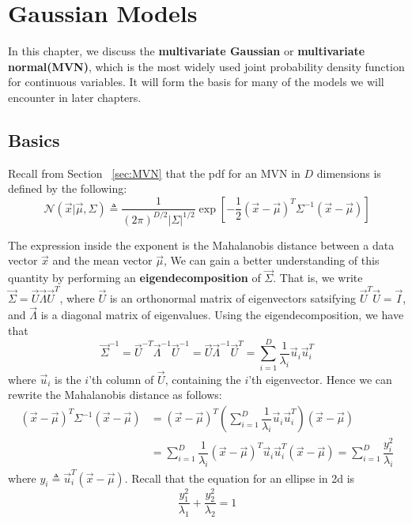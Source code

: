 \chapter{Gaussian Models}
\label{chap:MVN}

In this chapter, we discuss the \textbf{multivariate Gaussian} or \textbf{multivariate normal(MVN)}, which is the most widely used joint probability density function for continuous variables. It will form the basis for many of the models we will encounter in later chapters.


\section{Basics}
Recall from Section ~\ref{sec:MVN} that the pdf for an MVN in $D$ dimensions is defined by the following:
\begin{equation}
\mathcal{N}(\vec{x}|\vec{\mu},\Sigma) \triangleq \dfrac{1}{(2\pi)^{D/2}|\Sigma|^{1/2}}\exp\left[-\dfrac{1}{2}(\vec{x}-\vec{\mu})^T\Sigma^{-1}(\vec{x}-\vec{\mu})\right]
\end{equation}

The expression inside the exponent is the Mahalanobis distance between a data vector $\vec{x}$ and the mean vector $\vec{\mu}$, We can gain a better understanding of this quantity by performing an \textbf{eigendecomposition} of $\vec{\Sigma}$. That is, we write $\vec{\Sigma}=\vec{U}\vec{\Lambda}\vec{U}^T$, where $\vec{U}$ is an orthonormal matrix of eigenvectors satsifying $\vec{U}^T\vec{U}=\vec{I}$, and $\vec{\Lambda}$ is a diagonal matrix of eigenvalues. Using the eigendecomposition, we have that
\begin{equation}
\vec{\Sigma}^{-1}=\vec{U}^{-T}\vec{\Lambda}^{-1}\vec{U}^{-1}=\vec{U}\vec{\Lambda}^{-1}\vec{U}^T=\sum\limits_{i=1}^D \dfrac{1}{\lambda_i}\vec{u}_i\vec{u}_i^T
\end{equation}
where $\vec{u}_i$ is the $i$’th column of $\vec{U}$, containing the $i$’th eigenvector. Hence we can rewrite the Mahalanobis distance as follows:
\begin{align}
(\vec{x}-\vec{\mu})^T\Sigma^{-1}(\vec{x}-\vec{\mu})& =(\vec{x}-\vec{\mu})^T\left(\sum\limits_{i=1}^D \dfrac{1}{\lambda_i}\vec{u}_i\vec{u}_i^T\right)(\vec{x}-\vec{\mu}) \\
    & =\sum\limits_{i=1}^D \dfrac{1}{\lambda_i}(\vec{x}-\vec{\mu})^T\vec{u}_i\vec{u}_i^T(\vec{x}-\vec{\mu})=\sum\limits_{i=1}^D \dfrac{y_i^2}{\lambda_i}
\end{align}
where $y_i \triangleq \vec{u}_i^T(\vec{x}-\vec{\mu})$. Recall that the equation for an ellipse in 2d is
\begin{equation}
\dfrac{y_1^2}{\lambda_1}+\dfrac{y_2^2}{\lambda_2}=1
\end{equation}

